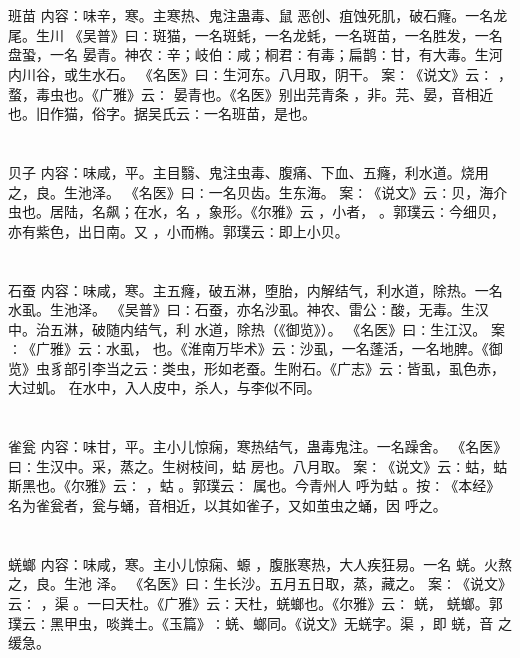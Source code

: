 \documentclass[12pt,UTF8]{ctexbook}
\begin{document}
\chapter{}班苗
内容：味辛，寒。主寒热、鬼注蛊毒、鼠 恶创、疽蚀死肌，破石癃。一名龙尾。生川 
《吴普》曰∶斑猫，一名斑蚝，一名龙蚝，一名斑苗，一名胜发，一名盘蛩，一名 
晏青。神农∶辛；岐伯∶咸；桐君∶有毒；扁鹊∶甘，有大毒。生河内川谷，或生水石。 
《名医》曰∶生河东。八月取，阴干。 
案∶《说文》云∶ ， 蝥，毒虫也。《广雅》云∶ 晏青也。《名医》别出芫青条 
，非。芫、晏，音相近也。旧作猫，俗字。据吴氏云∶一名班苗，是也。 


\chapter{}贝子
内容：味咸，平。主目翳、鬼注虫毒、腹痛、下血、五癃，利水道。烧用之，良。生池泽。 
《名医》曰∶一名贝齿。生东海。 
案∶《说文》云∶贝，海介虫也。居陆，名飙；在水，名 ，象形。《尔雅》云 
，小者， 。郭璞云∶今细贝，亦有紫色，出日南。又 ，小而椭。郭璞云∶即上小贝。 


\chapter{}石蚕
内容：味咸，寒。主五癃，破五淋，堕胎，内解结气，利水道，除热。一名水虱。生池泽。 
《吴普》曰∶石蚕，亦名沙虱。神农、雷公∶酸，无毒。生汉中。治五淋，破随内结气，利 
水道，除热（《御览》）。 
《名医》曰∶生江汉。 
案∶《广雅》云∶水虱， 也。《淮南万毕术》云∶沙虱，一名蓬活，一名地脾。《御 
览》虫豸部引李当之云∶类虫，形如老蚕。生附石。《广志》云∶皆虱，虱色赤，大过虮。 
在水中，入人皮中，杀人，与李似不同。 


\chapter{}雀瓮
内容：味甘，平。主小儿惊痫，寒热结气，蛊毒鬼注。一名躁舍。 
《名医》曰∶生汉中。采，蒸之。生树枝间，蛄 房也。八月取。 
案∶《说文》云∶蛄，蛄斯黑也。《尔雅》云∶ ，蛄 。郭璞云∶ 属也。今青州人 
呼为蛄 。按∶《本经》名为雀瓮者，瓮与蛹，音相近，以其如雀子，又如茧虫之蛹，因 
呼之。 


\chapter{}蜣螂
内容：味咸，寒。主小儿惊痫、螈 ，腹胀寒热，大人疾狂易。一名 蜣。火熬之，良。生池 
泽。 
《名医》曰∶生长沙。五月五日取，蒸，藏之。 
案∶《说文》云∶ ，渠 。一曰天杜。《广雅》云∶天杜，蜣螂也。《尔雅》云∶ 蜣， 
蜣螂。郭璞云∶黑甲虫，啖粪土。《玉篇》∶蜣、螂同。《说文》无蜣字。渠 ，即 蜣，音 
之缓急。 
\end{document}
